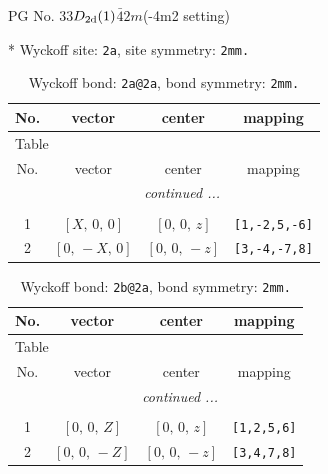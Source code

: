 \documentclass[fleqn,8pt]{jsarticle}
\begin{document}
\setcounter{MaxMatrixCols}{32}

\renewcommand{\tablename}{Table~}
\renewcommand{\figurename}{Figure~}
\begin{center}
\LARGE
PG No. 33\quad$D_{\rm 2d}(1)$\quad$\bar{4}2m$\quad(-4m2 setting)\quad[ tetragonal ]
\end{center}


* Wyckoff site: {\tt 2a}, site symmetry: {\tt 2mm.}
\renewcommand{\arraystretch}{1.2}
\begin{longtable}{cccc}
\caption{Wyckoff bond: {\tt 2a@2a}, bond symmetry: {\tt 2mm.}}
 \\
 \hline \hline
No. & vector & center & mapping \\ \hline \endfirsthead

\multicolumn{3}{l}{\tablename\ \thetable{}} \\
 \hline \hline
No. & vector & center & mapping \\ \hline \endhead

 \hline \hline
\multicolumn{3}{r}{\footnotesize\it continued ...} \\ \endfoot

 \hline \hline
\multicolumn{3}{r}{} \\ \endlastfoot

1 & $\left[ X,\, 0,\, 0 \right]$ & $\left[ 0,\, 0,\, z \right]$ & {\tt [1,-2,5,-6]} \\ \hline
2 & $\left[ 0,\, - X,\, 0 \right]$ & $\left[ 0,\, 0,\, - z \right]$ & {\tt [3,-4,-7,8]} \\
\end{longtable}
\renewcommand{\arraystretch}{1.2}
\begin{longtable}{cccc}
\caption{Wyckoff bond: {\tt 2b@2a}, bond symmetry: {\tt 2mm.}}
 \\
 \hline \hline
No. & vector & center & mapping \\ \hline \endfirsthead

\multicolumn{3}{l}{\tablename\ \thetable{}} \\
 \hline \hline
No. & vector & center & mapping \\ \hline \endhead

 \hline \hline
\multicolumn{3}{r}{\footnotesize\it continued ...} \\ \endfoot

 \hline \hline
\multicolumn{3}{r}{} \\ \endlastfoot

1 & $\left[ 0,\, 0,\, Z \right]$ & $\left[ 0,\, 0,\, z \right]$ & {\tt [1,2,5,6]} \\ \hline
2 & $\left[ 0,\, 0,\, - Z \right]$ & $\left[ 0,\, 0,\, - z \right]$ & {\tt [3,4,7,8]} \\
\end{longtable}
\end{document}
